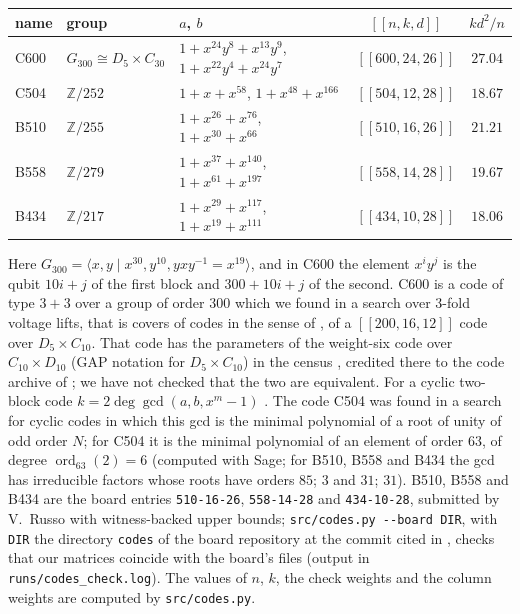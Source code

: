 \documentclass[11pt]{amsart}
\theoremstyle{definition}
\theoremstyle{remark}
\begin{document}
\begin{center}
\small
\begin{tabular}{lllcc}
\toprule
name & group & $a$, $b$ & $[[n,k,d]]$ & $kd^2/n$\\
\midrule
C600 & $G_{300}\cong D_5\times C_{30}$ & $1+x^{24}y^8+x^{13}y^9$, $1+x^{22}y^4+x^{24}y^7$ & $[[600,24,26]]$ & $27.04$\\
C504 & $\mathbb Z/252$ & $1+x+x^{58}$, $1+x^{48}+x^{166}$ & $[[504,12,28]]$ & $18.67$\\
B510 & $\mathbb Z/255$ & $1+x^{26}+x^{76}$, $1+x^{30}+x^{66}$ & $[[510,16,26]]$ & $21.21$\\
B558 & $\mathbb Z/279$ & $1+x^{37}+x^{140}$, $1+x^{61}+x^{197}$ & $[[558,14,28]]$ & $19.67$\\
B434 & $\mathbb Z/217$ & $1+x^{29}+x^{117}$, $1+x^{19}+x^{111}$ & $[[434,10,28]]$ & $18.06$\\
\bottomrule
\end{tabular}
\end{center}

Here $G_{300}=\langle x,y\mid x^{30},y^{10},yxy^{-1}=x^{19}\rangle$, and in C600 the element $x^iy^j$ is the qubit $10i+j$ of the first block and $300+10i+j$ of the second. C600 is a code of type $3+3$ over a group of order $300$ which we found in a search over $3$-fold voltage lifts, that is covers of codes in the sense of \cite{GZ25,HL26}, of a $[[200,16,12]]$ code over $D_5\times C_{10}$. That code has the parameters of the weight-six code over $C_{10}\times D_{10}$ (GAP notation for $D_5\times C_{10}$) in the census \cite[Table~9]{Lee26}, credited there to the code archive of \cite{LP24}; we have not checked that the two are equivalent. For a cyclic two-block code $k=2\deg\gcd(a,b,x^m-1)$ \cite[Eq.~(44)]{LP24}. The code C504 was found in a search for cyclic codes in which this gcd is the minimal polynomial of a root of unity of odd order $N$; for C504 it is the minimal polynomial of an element of order $63$, of degree $\operatorname{ord}_{63}(2)=6$ (computed with Sage; for B510, B558 and B434 the gcd has irreducible factors whose roots have orders $85$; $3$ and $31$; $31$). B510, B558 and B434 are the board entries \texttt{510-16-26}, \texttt{558-14-28} and \texttt{434-10-28}, submitted by V.~Russo with witness-backed upper bounds; \texttt{src/codes.py -{}-board DIR}, with \texttt{DIR} the directory \texttt{codes} of the board repository at the commit cited in \cite{Board}, checks that our matrices coincide with the board's files (output in \texttt{runs/codes\_check.log}). The values of $n$, $k$, the check weights and the column weights are computed by \texttt{src/codes.py}.
\end{document}
